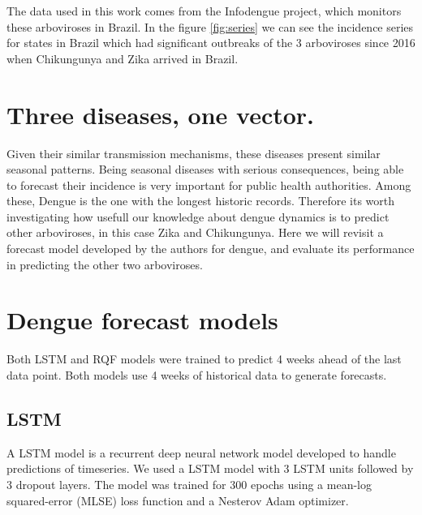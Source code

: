 \documentclass[a0,portrait]{a0poster}
\begin{document}
\begin{multicols}{3}
The data used in this work comes from the Infodengue project, which monitors 
these arboviroses in Brazil. In the figure \ref{fig:series} we can see the 
incidence series for states in Brazil which had significant outbreaks of the 3 
arboviroses since 2016 when Chikungunya and Zika arrived in Brazil.
\section*{Three diseases, one vector.}

\noindent
Given their similar transmission mechanisms, these diseases present similar 
seasonal patterns. Being seasonal diseases with serious consequences, being 
able to forecast their incidence is very important for public health 
authorities. Among these, Dengue is the one with the longest historic records. 
Therefore its worth investigating how usefull our knowledge about dengue 
dynamics is to predict other arboviroses, in this case Zika and Chikungunya. 
Here we will revisit a forecast model developed by the authors for dengue, and 
evaluate its performance in predicting the other two arboviroses.



\section*{Dengue forecast models}
Both LSTM and RQF models were trained to predict 4 weeks ahead of the last data 
point. Both models use 4 weeks of historical data to generate 
forecasts. 
\subsection*{LSTM}
\noindent
A LSTM model is a recurrent deep neural network model developed to handle 
predictions of timeseries. We used a LSTM model with 3 LSTM units followed by 
3 dropout layers. The model was trained for 300 epochs using a mean-log 
squared-error (MLSE) loss function  and a Nesterov Adam 
optimizer\cite{sutskever2013importance}. 


\end{multicols}
\end{document}
